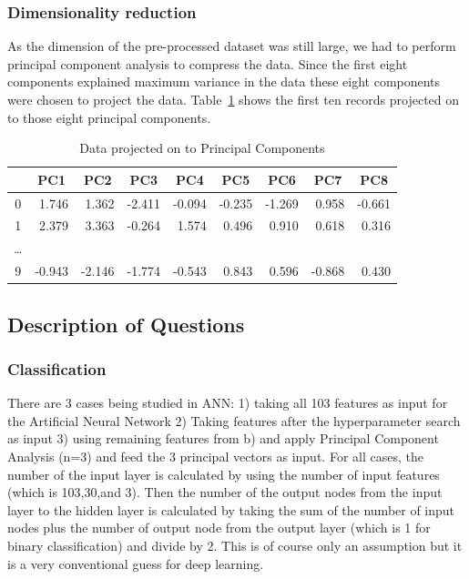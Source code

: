 \documentclass{article}
\begin{document}
\subsubsection{Dimensionality reduction}

As the dimension of the pre-processed dataset was still large, we had to perform principal component analysis to compress the data. Since the first eight components explained maximum variance in the data these eight components were chosen to project the data. Table~\ref{table:Table2} shows the first ten records projected on to those eight principal components.

\begin{table}[H]
\caption{Data projected on to Principal Components}
  \label{table:Table2}
  \centering
\begin{tabular}{@{}crrrrrrrr@{}}
\toprule
   & \multicolumn{1}{c}{PC1} & \multicolumn{1}{c}{PC2} & \multicolumn{1}{c}{PC3} & \multicolumn{1}{c}{PC4} & \multicolumn{1}{c}{PC5} & \multicolumn{1}{c}{PC6} & \multicolumn{1}{c}{PC7} & \multicolumn{1}{c}{PC8} \\ \midrule
0  & 1.746                   & 1.362                   & -2.411                  & -0.094                  & -0.235                  & -1.269                  & 0.958                   & -0.661                  \\
1  & 2.379                   & 3.363                   & -0.264                  & 1.574                   & 0.496                   & 0.910                   & 0.618                   & 0.316                   \\
\ldots &&&&&&&& \\
9  & -0.943                  & -2.146                  & -1.774                  & -0.543                  & 0.843                   & 0.596                   & -0.868                  & 0.430                   \\ 
\bottomrule
\end{tabular}
\end{table}

\subsection{Description of Questions}

\subsubsection{Classification}

There are 3 cases being studied in ANN: 1) taking all 103 features as input for the Artificial Neural Network 2) Taking features after the hyperparameter search as input 3) using remaining features from b) and apply Principal Component Analysis (n=3) and feed the 3 principal vectors as input.
For all cases, the number of the input layer is calculated by using the number of input features (which is 103,30,and 3). Then the number of the output nodes from the input layer to the hidden layer is calculated by taking the sum of the number of input nodes plus the number of output node from the output layer (which is 1 for binary classification) and divide by 2. This is of course only an assumption but it is a very conventional guess for deep learning. 
\end{document}
